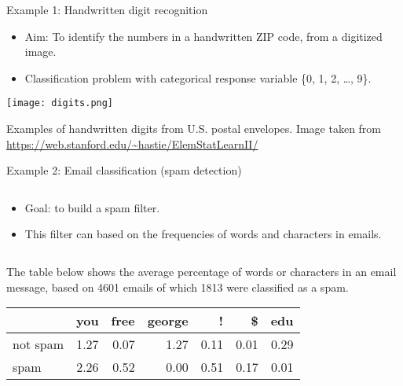 \documentclass[ignorenonframetext,]{beamer}
\providecommand{\tightlist}{%
  \setlength{\itemsep}{0pt}\setlength{\parskip}{0pt}}
\begin{document}
\begin{frame}

\begin{block}{Example 1: Handwritten digit recognition}

\begin{itemize}
\tightlist
\item
  Aim: To identify the numbers in a handwritten ZIP code, from a
  digitized image.
\item
  Classification problem with categorical response variable \{0, 1, 2,
  \ldots{}, 9\}. \vspace{1mm}
\end{itemize}

\centering

\texttt{[image: digits.png]}
\vspace{1mm}

\flushleft

Examples of handwritten digits from U.S. postal envelopes. \scriptsize
Image taken from \url{https://web.stanford.edu/~hastie/ElemStatLearnII/}

\end{block}

\end{frame}

\begin{frame}

\begin{block}{Example 2: Email classification (spam detection)}

\(~\)

\begin{itemize}
\tightlist
\item
  Goal: to build a spam filter.
\end{itemize}

\vspace{1mm}

\begin{itemize}
\tightlist
\item
  This filter can based on the frequencies of words and characters in
  emails.
\end{itemize}

\(~\)

The table below shows the average percentage of words or characters in
an email message, based on 4601 emails of which 1813 were classified as
a spam.

\begin{longtable}[]{@{}lrrrrrr@{}}
\toprule
& you & free & george & ! & \$ & edu\tabularnewline
\midrule
\endhead
not spam & 1.27 & 0.07 & 1.27 & 0.11 & 0.01 & 0.29\tabularnewline
spam & 2.26 & 0.52 & 0.00 & 0.51 & 0.17 & 0.01\tabularnewline
\bottomrule
\end{longtable}

\end{block}

\end{frame}
\end{document}
